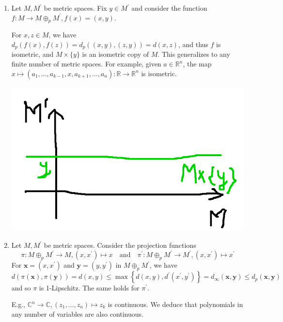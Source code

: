 \documentclass[a4paper]{article}
\begin{document}
\begin{example}
\begin{enumerate}
        \item Let $M, M^{\prime}$ be metric spaces.
        Fix $y \in M^{\prime}$ and consider the function $f: M \rightarrow M \oplus_p M^{\prime}, f(x)=(x, y)$. 
        
        For $x, z \in M$, we have $d_p(f(x), f(z))=d_p((x, y),(z, y))=d(x, z)$, and thus $f$ is isometric, and $M \times\{y\}$ is an isometric copy of $M$.
        This generalizes to any finite number of metric spaces. For example, given $a \in \mathbb{R}^n$, the map $x \mapsto\left(a_1, \ldots, a_{k-1}, x, a_{k+1}, \ldots, a_n\right): \mathbb{R} \rightarrow \mathbb{R}^n$ is isometric.

        \begin{center}
            \includegraphics[scale=0.2]{at2.png}
        \end{center}
        
        \item Let $M, M^{\prime}$ be metric spaces. Consider the projection functions
        \[
            \pi: M \oplus_p M^{\prime} \rightarrow M,\left(x, x^{\prime}\right) \mapsto x \quad \text{and}\quad \pi^{\prime}: M \oplus_p M^{\prime} \rightarrow M^{\prime},\left(x, x^{\prime}\right) \mapsto x^{\prime}
        \]
        For $\mathbf{x}=\left(x, x^{\prime}\right)$ and $\mathbf{y}=\left(y, y^{\prime}\right)$ in $M \oplus_p M^{\prime}$, we have
        \[
        d(\pi(\mathbf{x}), \pi(\mathbf{y}))=d(x, y) \leqslant \max \left\{d(x, y), d^{\prime}\left(x^{\prime}, y^{\prime}\right)\right\}=d_{\infty}(\mathbf{x}, \mathbf{y}) \leqslant d_p(\mathbf{x}, \mathbf{y})
        \]
        and so $\pi$ is 1-Lipschitz. The same holds for $\pi^{\prime}$.

        E.g., $\mathbb{C}^n \rightarrow \mathbb{C},\left(z_1, \ldots, z_n\right) \mapsto z_k$ is continuous. We deduce that polynomials in any number of variables are also continuous.
    \end{enumerate}
\end{example}
\end{document}
